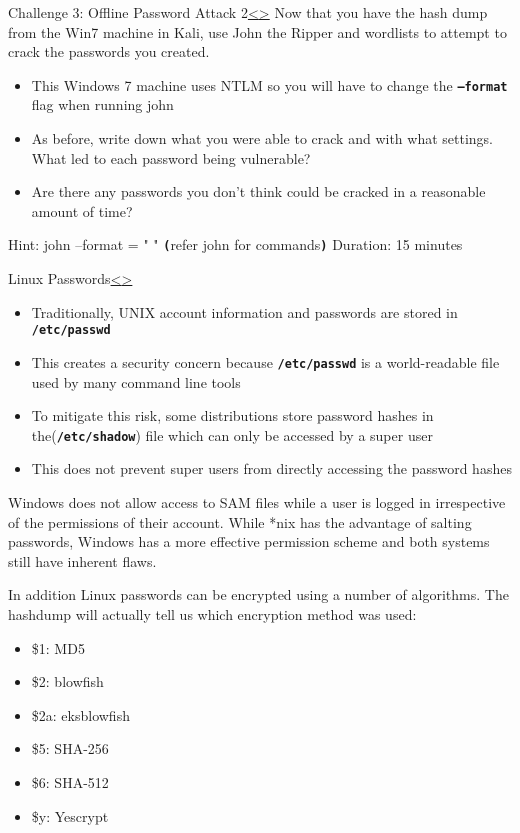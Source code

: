 \documentclass[12pt]{article}
\newcommand{\code}[1]{\texttt{\bfseries#1}}
\newenvironment{instructionblock}{\Large\bgroup}{\egroup}
\newcommand{\bi}{\begin{itemize}}
\newcommand{\ei}{\end{itemize}}
\begin{document}
\pagebreak
\begin{slide}{Challenge 3: Offline Password Attack 2}{\hyperref[slide 16]{\textless}\hyperref[slide 18]{\textgreater}}
	\begin{instructionblock}
		Now that you have the hash dump from the Win7 machine in Kali, use John the Ripper and wordlists to attempt to crack the passwords you created.
		\bi 
			\item This Windows 7 machine uses NTLM so you will have to change the \code{--format} flag when running john
			\item As before, write down what you were able to crack and with what settings. What led to each password being vulnerable?
			\item Are there any passwords you don't think could be cracked in a reasonable amount of time?
		\ei
	\end{instructionblock}
\end{slide}
Hint: john --format = " " \code(refer john for commands\code) 
\vfill
Duration: 15 minutes


\pagebreak
\begin{slide}{Linux Passwords}{\hyperref[slide 17]{\textless}\hyperref[slide 19]{\textgreater}}
	\begin{instructionblock}
		\begin{itemize}
			\item Traditionally, UNIX account information and passwords are stored in \code{/etc/passwd}
			\item This creates a security concern because \code{/etc/passwd} is a world-readable file used by many command line tools
			\item To mitigate this risk, some distributions store password hashes in the(\code{/etc/shadow}) file which can only be accessed by a super user
			\item This does not prevent super users from directly accessing the password hashes
		\end{itemize}
	\end{instructionblock}
\end{slide}
Windows does not allow access to SAM files while a user is logged in irrespective of the permissions of their account. While *nix has the advantage of salting passwords, Windows has a more effective permission scheme and both systems still have inherent flaws.

In addition Linux passwords can be encrypted using a number of algorithms. The hashdump will actually tell us which encryption method was used:
\bi
	\item \$1: MD5
	\item \$2: blowfish
	\item \$2a: eksblowfish
	\item \$5: SHA-256
	\item \$6: SHA-512 
    \item \$y: Yescrypt
\ei
\vfill
\end{document}
